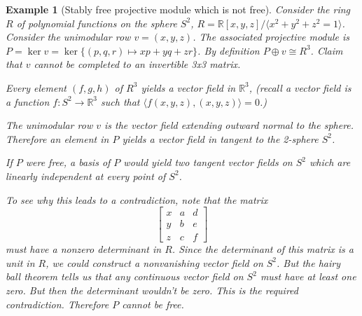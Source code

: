 \documentclass[12pt]{article}
\numberwithin{equation}{section}
\newcommand{\R}{\mathbb{R}}
\newcounter{dummy} \numberwithin{dummy}{section}
\newtheorem{example}[dummy]{Example}
\begin{document}
	\begin{example}[Stably free projective module which is not free]
		Consider the ring $R$ of polynomial functions on the sphere $S^2$, $R=\mathbb{R}[x,y,z]/\langle x^2+y^2+z^2=1 \rangle$. Consider the unimodular row $v=(x,y,z)$. The associated projective module is $P=\ker v = \ker \{(p,q,r) \mapsto xp+yq+zr\}$. By definition $P \oplus v \cong R^3$. Claim that $v$ cannot be completed to an invertible 3x3 matrix.
		
		Every element $(f, g, h)$ of $R^3$ yields a vector field in $\R^3$, (recall a vector field is a function $f:S^2 \to \R^3$ such that $\langle f(x,y,z), (x,y,z) \rangle=0 $.)
		
		The unimodular row $v$ is the vector field extending outward normal to the sphere. Therefore an element in $P$ yields a vector field in tangent to the 2-sphere $S^2$. 
		
		If $P$ were free, a basis of $P$ would yield two tangent vector fields on $S^2$ which are linearly independent at every point of $S^2$.
		
		To see why this leads to a contradiction, note that the matrix
		\[
		\begin{bmatrix}
			x & a & d \\
			y & b & e \\
			z & c & f
		\end{bmatrix}
		\]
		must have a nonzero determinant in $R$. Since the determinant of this matrix is a unit in $R$, we could construct a nonvanishing vector field on $S^2$. But the hairy ball theorem tells us that any continuous vector field on $S^2$ must have at least one zero.
		But then the determinant wouldn't be zero. This is the required contradiction. Therefore $P$ cannot be free.
		
	\end{example}
	
\end{document}
